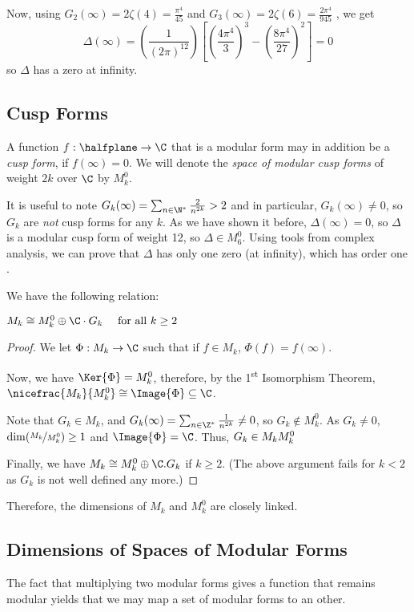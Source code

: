 Now, using 
$
G_2(\infty) = 2\zeta(4) = \frac{\pi^4}{45}
$
 and 
$
G_3(\infty) = 2\zeta(6) = \frac{2\pi^4}{945}
$
, we get 
$$
\Delta(\infty) = \left( \frac{1}{(2\pi)^{12}} \right) \left[ \left( \frac{4\pi^4}{3} \right)^3 - \left( \frac{8\pi^4}{27} \right)^2 \right] =  0
$$
so $\Delta$ has a zero at infinity.


\subsection{Cusp Forms}
A function $f:\halfplane \to \C$ that is a modular form may in addition be a \textit{cusp form}, if $f(\infty)=0$.
We will denote the \textit{space of modular cusp forms} of weight $2k$ over $\C$ by $M_k^0$.

It is useful to note $G_k(\infty) = \sum_{n \in \N^*} \frac{2}{n^{2k}} > 2$ and in particular, $G_k(\infty) \neq 0$, so $G_k$ are \textit{not} cusp forms for any $k$.
As we have shown it before, $\Delta(\infty)=0$, so $\Delta$ is a modular cusp form of weight 12, so $\Delta \in M_6^0$.
Using tools from complex analysis, we can prove that $\Delta$ has only one zero (at infinity), which has order one \cite[p.88]{CourseInArithmetic}.

We have the following relation: 
\begin{theorem}
    $M_k \cong M_k^0 \oplus \C \cdot G_k \quad \text{ for all } k \geq 2$ \cite[p.88]{CourseInArithmetic}
\end{theorem}
\begin{proof}
    We let $\Phi:M_k \to \C$ such that if $f \in M_k$, $\Phi(f) = f(\infty)$.
    
    Now, we have $\Ker{\Phi} = M_k^0$, therefore, by the 1\textsuperscript{st} Isomorphism Theorem, $\nicefrac{M_k}{M_k^0} \cong \Image{\Phi} \subseteq \C$.
    
    Note that $G_k \in M_k$, and $G_k(\infty) = \sum_{n \in \Z^*} \frac{1}{n^{2k}} \neq 0$, so $G_k \not\in M_k^0$.
    As $G_k \neq 0$, $\dim(\nicefrac{M_k}{M_k^0}) \geq 1$ and $\Image{\Phi} = \C$.
    Thus, $G_k \in M_k\\M_k^0$
    
    Finally, we have $M_k \cong M_k^0 \oplus \C.G_k$ if $k \geq 2$.
    (The above argument fails for $k<2$ as $G_k$ is not well defined any more.)
\end{proof}
Therefore, the dimensions of $M_k$ and $M_k^0$ are closely linked.



\subsection{Dimensions of Spaces of Modular Forms}
The fact that multiplying two modular forms gives a function that remains modular yields that we may map a set of modular forms to an other.

